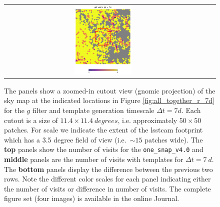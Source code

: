 \documentclass[preprintm,linenumbers]{aastex631}
\newcommand{\baseline}{\texttt{one\_snap\_v4.0}\xspace}
\begin{document}
\begin{figure}
\begin{tabular}{  c c c}
				\includegraphics[width=0.3\textwidth]{results/skymaps_cutout/skymaps_cutout_delta_first_year_one_snap_v4_0_10yrs_db_noDD_noTwi_tscale-7_nside-256_doAllTemplateMetrics_reduceCount_g_GP_noDD_noTwi.pdf} \\
			\end{tabular}
			\caption{
				The panels show a zoomed-in cutout view (gnomic projection) of the sky map at the indicated locations in Figure \ref{fig:all_together_r_7d} for the $g$ filter and template generation timescale $\Delta t = 7 \si{d}$.
				Each cutout is a size of $11.4 \times 11.4\ \si{degrees}$, i.e. approximately $50 \times 50$ patches.
				For scale we indicate the extent of the \gls*{lsstcam} footprint which has a 3.5 degree field of view (i.e.\ $\sim15$ patches wide).
The \textbf{top} panels show the number of visits for the \baseline and \textbf{middle} panels are the number of visits with templates for $\Delta t = 7\ \si{d}$.
The \textbf{bottom} panels display the difference between the previous two rows.
				Note the different color scales for each panel indicating either the number of visits or difference in number of visits. 	
              The complete figure set (four images) is available in the online Journal. 
    }
	\label{fig:skymap_cutouts_g_7}
		\end{figure}
\end{document}
